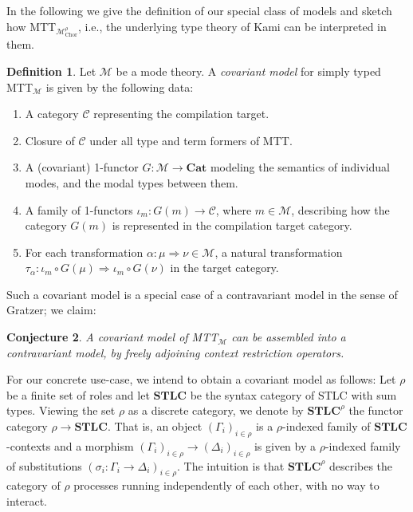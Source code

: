 \documentclass{scrartcl}
\theoremstyle{definition}
\newtheorem{definition}{Definition}
\theoremstyle{plain}
\newtheorem{conjecture}[definition]{Conjecture}
\begin{document}
In the following we give the definition of our special class of models and
sketch how MTT${}_{\mathcal{M}^\rho_{\textrm{Chor}}}$, i.e., the underlying
type theory of Kami can be interpreted in them.
\begin{definition}
  Let $\mathcal{M}$ be a mode theory. A \emph{covariant model} for
  simply typed MTT$_{\mathcal{M}}$ is given by the following data:
  \begin{enumerate}
  \item
    A category $\mathcal{C}$ representing the compilation target.
  \item
    Closure of $\mathcal{C}$ under all type and term formers of MTT.
  \item
    A (covariant) 1-functor $G : \mathcal{M} \to \textbf{Cat}$ modeling the
    semantics of individual modes, and the modal types between them.
  \item
    A family of 1-functors $\iota_m : G(m) \to \mathcal{C}$, where $m \in
    \mathcal{M}$, describing how the category $G(m)$ is represented in the
    compilation target category.
  \item
    For each transformation $\alpha : \mu \Rightarrow \nu \in \mathcal{M}$, a
    natural transformation $\tau_\alpha : \iota_m \circ G(\mu) \Rightarrow
    \iota_m \circ G(\nu)$ in the target category.
  \end{enumerate}
\end{definition}
Such a covariant model is a special case of a contravariant model in the sense
of Gratzer; we claim:
\begin{conjecture}
  A covariant model of MTT$_{\mathcal{M}}$ can be assembled into a
  contravariant model, by freely adjoining context restriction operators.
\end{conjecture}
For our concrete use-case, we intend to obtain a covariant model as follows:
Let $\rho$ be a finite set of roles and let $\textbf{STLC}$ be the syntax
category of STLC with sum types. Viewing the set $\rho$ as a discrete category,
we denote by $\textbf{STLC}^\rho$ the functor category $\rho \to
\textbf{STLC}$. That is, an object $(\Gamma_i)_{i\in\rho}$ is a $\rho$-indexed
family of $\textbf{STLC}$-contexts and a morphism $(\Gamma_i)_{i\in\rho} \to
(\Delta_i)_{i\in\rho}$ is given by a $\rho$-indexed family of substitutions
$(\sigma_i : \Gamma_i \to \Delta_i)_{i\in\rho}$. The intuition is that
$\textbf{STLC}^\rho$ describes the category of $\rho$ processes running
independently of each other, with no way to interact.
\end{document}
